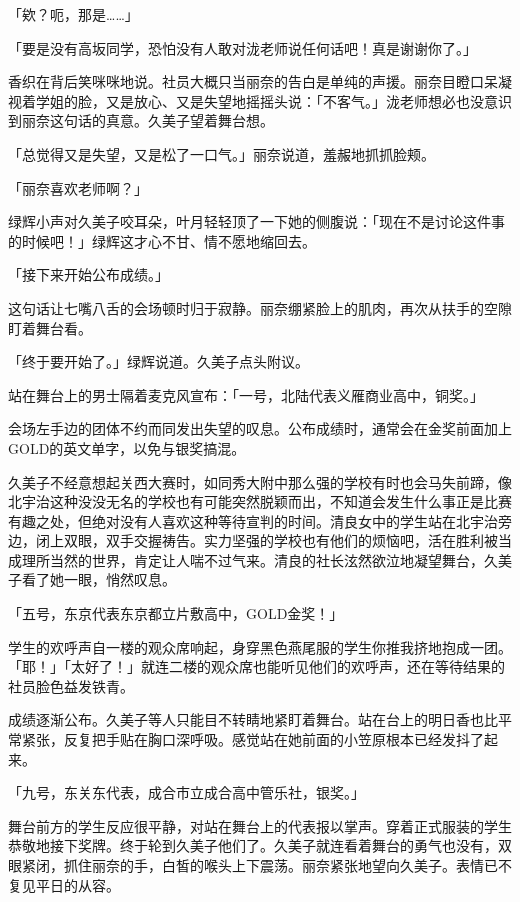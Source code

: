 \documentclass[UTF8]{ctexart}
\begin{document}
    「欸？呃，那是……」 

    「要是没有高坂同学，恐怕没有人敢对泷老师说任何话吧！真是谢谢你了。」 

    香织在背后笑咪咪地说。社员大概只当丽奈的告白是单纯的声援。丽奈目瞪口呆凝视着学姐的脸，又是放心、又是失望地摇摇头说：「不客气。」泷老师想必也没意识到丽奈这句话的真意。久美子望着舞台想。 

    「总觉得又是失望，又是松了一口气。」丽奈说道，羞赧地抓抓脸颊。 

    「丽奈喜欢老师啊？」 

    绿辉小声对久美子咬耳朵，叶月轻轻顶了一下她的侧腹说：「现在不是讨论这件事的时候吧！」绿辉这才心不甘、情不愿地缩回去。 

    「接下来开始公布成绩。」 

    这句话让七嘴八舌的会场顿时归于寂静。丽奈绷紧脸上的肌肉，再次从扶手的空隙盯着舞台看。 

    「终于要开始了。」绿辉说道。久美子点头附议。 

    站在舞台上的男士隔着麦克风宣布：「一号，北陆代表义雁商业高中，铜奖。」 

    会场左手边的团体不约而同发出失望的叹息。公布成绩时，通常会在金奖前面加上GOLD的英文单字，以免与银奖搞混。 

    久美子不经意想起关西大赛时，如同秀大附中那么强的学校有时也会马失前蹄，像北宇治这种没没无名的学校也有可能突然脱颖而出，不知道会发生什么事正是比赛有趣之处，但绝对没有人喜欢这种等待宣判的时间。清良女中的学生站在北宇治旁边，闭上双眼，双手交握祷告。实力坚强的学校也有他们的烦恼吧，活在胜利被当成理所当然的世界，肯定让人喘不过气来。清良的社长泫然欲泣地凝望舞台，久美子看了她一眼，悄然叹息。 

    「五号，东京代表东京都立片敷高中，GOLD金奖！」 

    学生的欢呼声自一楼的观众席响起，身穿黑色燕尾服的学生你推我挤地抱成一团。「耶！」「太好了！」就连二楼的观众席也能听见他们的欢呼声，还在等待结果的社员脸色益发铁青。 

    成绩逐渐公布。久美子等人只能目不转睛地紧盯着舞台。站在台上的明日香也比平常紧张，反复把手贴在胸口深呼吸。感觉站在她前面的小笠原根本已经发抖了起来。 

    「九号，东关东代表，成合市立成合高中管乐社，银奖。」 

    舞台前方的学生反应很平静，对站在舞台上的代表报以掌声。穿着正式服装的学生恭敬地接下奖牌。终于轮到久美子他们了。久美子就连看着舞台的勇气也没有，双眼紧闭，抓住丽奈的手，白皙的喉头上下震荡。丽奈紧张地望向久美子。表情已不复见平日的从容。 
\end{document}
